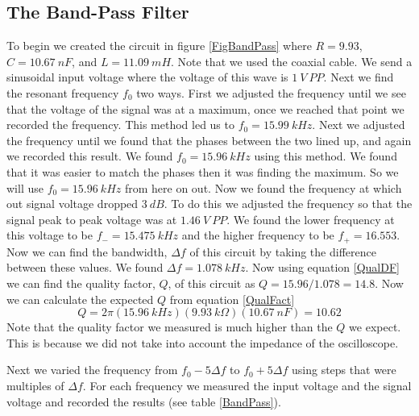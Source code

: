 \documentclass[11pt]{article}
\numberwithin{equation}{section}
\numberwithin{figure}{section}
\numberwithin{table}{section}
\begin{document}
\subsection{The Band-Pass Filter}
To begin we created the circuit in figure \ref{FigBandPass} where $R=9.93$, $C=10.67\ nF$, and $L=11.09\ mH$. Note that we used the coaxial cable. We send a sinusoidal input voltage where the voltage of this wave is $1\ V\ PP$. Next we find the resonant frequency $f_0$ two ways. First we adjusted the frequency until we see that the voltage of the signal was at a maximum, once we reached that point we recorded the frequency. This method led us to $f_0 = 15.99\ kHz$. Next we adjusted the frequency until we found that the phases between the two lined up, and again we recorded this result. We found $f_0 = 15.96\ kHz$ using this method. We found that it was easier to match the phases then it was finding the maximum. So we will use $f_0 = 15.96\ kHz$ from here on out. Now we found the frequency at which out signal voltage dropped $3\ dB$. To do this we adjusted the frequency so that the signal peak to peak voltage was at $1.46\ V\ PP$. We found the lower frequency at this voltage to be $f_-=15.475\ kHz$ and the higher frequency to be $f_+ = 16.553$. Now we can find the bandwidth, $\Delta f$ of this circuit by taking the difference between these values. We found $\Delta f = 1.078\ kHz$. Now using equation \ref{QualDF} we can find the quality factor, $Q$, of this circuit as $Q = 15.96/1.078 = 14.8$. Now we can calculate the expected $Q$ from equation \ref{QualFact} 
$$Q = 2\pi(15.96\ kHz)(9.93\ k\Omega)(10.67\ nF) = 10.62$$
Note that the quality factor we measured is much higher than the $Q$ we expect. This is because we did not take into account the impedance of the oscilloscope.

Next we varied the frequency from $f_0-5\Delta f$ to $f_0+5\Delta f$ using steps that were multiples of $\Delta f$. For each frequency we measured the input voltage and the signal voltage and recorded the results (see table \ref{BandPass}).
\end{document}
